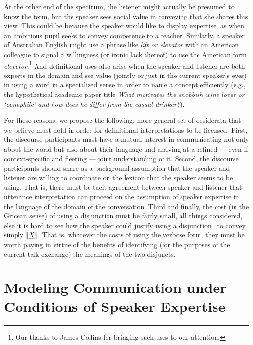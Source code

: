 \documentclass[12pt,twoside]{article}
\newcommand{\word}[1]{\emph{#1}}
\newcommand{\sem}[1]{\ensuremath{\llbracket#1\rrbracket}}
\renewcommand{\_}{\textbf{\textunderscore\hspace{-4pt}\textunderscore\hspace{-3pt}\textunderscore\hspace{-4pt}\textunderscore}\hspace{0.5pt}}			%
\begin{document}
At the other end of the spectrum, the listener might actually be
presumed to know the term, but the speaker sees social value in
conveying that she shares this view. This could be because the speaker
would like to display expertise, as when an ambitious pupil seeks to
convey competence to a teacher. Similarly, a speaker of Australian
English might use a phrase like \word{lift or elevator} with an
American colleague to signal a willingness (or ironic lack thereof) to
use the American form \word{elevator}.\footnote{Our thanks to James
  Collins for bringing such uses to our attention.}  And definitional
uses also arise when the speaker and listener are both experts in the
domain and see value (jointly or just in the current speaker's eyes)
in using a word in a specialized sense in order to name a concept
efficiently (e.g., the hypothetical academic paper title \word{What
  motivates the snobbish wine lover or `oenophile' and how does he
  differ from the casual drinker?}).

For these reasons, we propose the following, more general set of
desiderata that we believe must hold in order for definitional
interpretations to be licensed.  First, the discourse participants
must have a mutual interest in communicating not only about the world
but also about their language and arriving at a refined --- even if
context-specific and fleeting --- joint understanding of it. Second,
the discourse participants should share as a background assumption
that the speaker and listener are willing to coordinate on the lexicon
that the speaker seems to be using.  That is, there must be tacit
agreement between speaker and listener that utterance interpretation
can proceed on the assumption of speaker expertise in the language of
the domain of the conversation.  Third and finally, the cost (in the
Gricean sense) of using a disjunction must be fairly small, all things
considered, else it is hard to see how the speaker could justify using
a disjunction \XorY\ to convey simply $\sem{\word{X\/}}$.  That is,
whatever the costs of using the verbose form, they must be worth
paying in virtue of the benefits of identifying (for the purposes of
the current talk exchange) the meanings of the two disjuncts.


\section{Modeling Communication under Conditions of Speaker Expertise}\label{sec:model}
\end{document}
